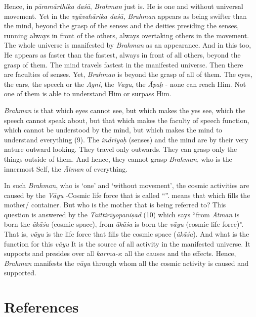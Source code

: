 Hence, in \emph{pāramārthika daśā}, \emph{Brahman} just is. He is one and without universal movement. Yet in the \emph{vyāvahārika daśā, Brahman} appears as being swifter than the mind, beyond the grasp of the senses and the deities presiding the senses, running always in front of the others, always overtaking others in the movement. The whole universe is manifested by \emph{Brahman} as an appearance. And in this too, He appears as faster than the fastest, always in front of all others, beyond the grasp of them. The mind travels fastest in the manifested universe. Then there are faculties of senses. Yet, \emph{Brahman} is beyond the grasp of all of them. The eyes, the ears, the speech or the \emph{Agni}, the \emph{Vayu}, the \emph{Āpaḥ} - none can reach Him. Not one of them is able to understand Him or surpass Him.
\newpage

\emph{Brahman} is that which eyes cannot see, but which makes the yes see, which the speech cannot speak about, but that which makes the faculty of speech function, which cannot be understood by the mind, but which makes the mind to understand everything (9). The \emph{indriyaḥ} (senses) and the mind are by their very nature outward looking. They travel only outwards. They can grasp only the things outside of them. And hence, they cannot grasp \emph{Brahman}, who is the innermost Self, the \emph{Ātman} of everything.

In such \emph{Brahman}, who is `one' and `without movement', the cosmic activities are caused by the \emph{Vāyu} -Cosmic life force that is called ``''.  means that which fills the mother/ container. But who is the mother that is being referred to? This question is answered by the \emph{Taittirīyopaniṣad} (10) which says ``from \emph{Ātman} is born the \emph{ākāśa} (cosmic space), from \emph{ākāśa} is born the \emph{vāyu} (cosmic life force)''. That is, \emph{vāyu} is the life force that fills the cosmic space (\emph{ākāśa}). And what is the function for this \emph{vāyu} It is the source of all activity in the manifested universe. It supports and presides over all \emph{karma-s}: all the causes and the effects. Hence, \emph{Brahman} manifests the \emph{vāyu} through whom all the cosmic activity is caused and supported.

\section*{References}

